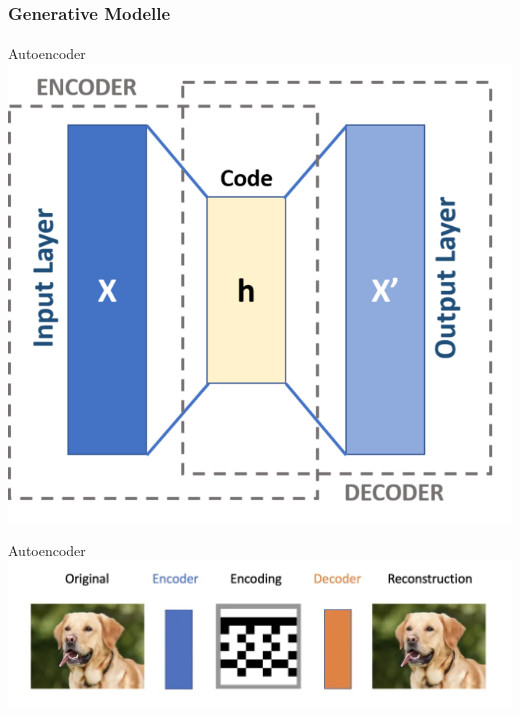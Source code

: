 \documentclass{beamer}
\begin{document}
\begin{frame}
    \frametitle{Generative Modelle}
\framesubtitle{}
\begin{block}{Autoencoder}
    \center
    \includegraphics[scale=0.35]{images/autoencoder}
\end{block}
\begin{block}{Autoencoder}
    \center
    \includegraphics[scale=0.25]{images/autoencoder_train}
\end{block}
\end{frame}
\end{document}
